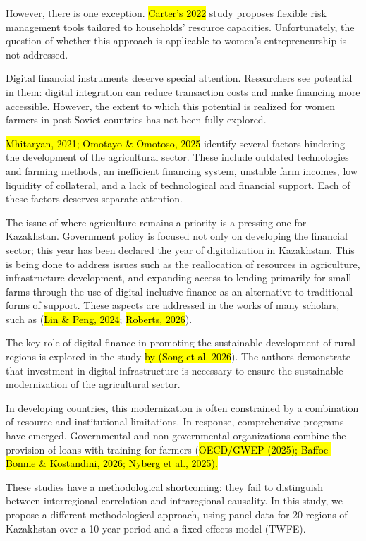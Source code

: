 \documentclass[
]{article}
\begin{document}
However, there is one exception. \hl{Carter's 2022} study proposes
flexible risk management tools tailored to households' resource
capacities. Unfortunately, the question of whether this approach is
applicable to women's entrepreneurship is not addressed.

Digital financial instruments deserve special attention. Researchers see
potential in them: digital integration can reduce transaction costs and
make financing more accessible. However, the extent to which this
potential is realized for women farmers in post-Soviet countries has not
been fully explored.

\hl{Mhitaryan, 2021; Omotayo \& Omotoso, 2025} identify several factors
hindering the development of the agricultural sector. These include
outdated technologies and farming methods, an inefficient financing
system, unstable farm incomes, low liquidity of collateral, and a lack
of technological and financial support. Each of these factors deserves
separate attention.

The issue of where agriculture remains a priority is a pressing one for
Kazakhstan. Government policy is focused not only on developing the
financial sector; this year has been declared the year of digitalization
in Kazakhstan. This is being done to address issues such as the
reallocation of resources in agriculture, infrastructure development,
and expanding access to lending primarily for small farms through the
use of digital inclusive finance as an alternative to traditional forms
of support. These aspects are addressed in the works of many scholars,
such as (\hl{Lin \& Peng, 2024}; \hl{Roberts, 2026}).

The key role of digital finance in promoting the sustainable development
of rural regions is explored in the study \hl{by (Song et al. 2026}).
The authors demonstrate that investment in digital infrastructure is
necessary to ensure the sustainable modernization of the agricultural
sector.

In developing countries, this modernization is often constrained by a
combination of resource and institutional limitations. In response,
comprehensive programs have emerged. Governmental and non-governmental
organizations combine the provision of loans with training for farmers
(\hl{OECD/GWEP (2025); Baffoe‐Bonnie \& Kostandini, 2026; Nyberg et al.,
2025).}

These studies have a methodological shortcoming: they fail to
distinguish between interregional correlation and intraregional
causality. In this study, we propose a different methodological
approach, using panel data for 20 regions of Kazakhstan over a 10-year
period and a fixed-effects model (TWFE).
\end{document}
